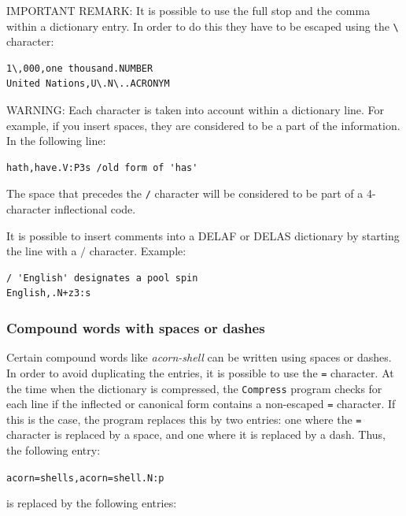 \bigskip
\noindent IMPORTANT REMARK: It is possible to use the full stop and the comma
within a dictionary entry. In order to do this they have to be escaped using the
\verb+\+ \index{\verb+\,+}\index{\verb+\.+}\index{\verb+\+} character:

\bigskip
\begin{verbatim}
1\,000,one thousand.NUMBER
United Nations,U\.N\..ACRONYM
\end{verbatim}


\bigskip
\noindent WARNING: Each character is taken into account within a dictionary
line. For example, if you insert spaces, they are considered to be a part of the
information. In the following line:

\begin{verbatim}
hath,have.V:P3s /old form of 'has'
\end{verbatim}

\bigskip \noindent The space that precedes the \verb+/+ character will be
considered to be part of a 4-character inflectional code.

\bigskip \noindent It is possible to insert comments into a DELAF or DELAS
dictionary by starting the line with a $/$ character. Example:

\bigskip
\begin{verbatim}
/ 'English' designates a pool spin
English,.N+z3:s
\end{verbatim}


\subsubsection{Compound words with spaces or dashes}

\index{\verb+=+}\index{\verb+\=+}

Certain compound words like \textit{acorn-shell} can be written using spaces or
dashes. In order to avoid duplicating the entries, it is possible to use the
\verb+=+ character. At the time when the dictionary is compressed, the
\verb+Compress+ program  checks for each line if the
inflected or canonical form contains a non-escaped \verb+=+ character. If this is
the case, the program replaces this by two entries: one where the \verb+=+
character is replaced by a space, and one where it is replaced by a dash. Thus,
the following entry:

\bigskip \verb$acorn=shells,acorn=shell.N:p$

\bigskip
\noindent is replaced by the following entries:


